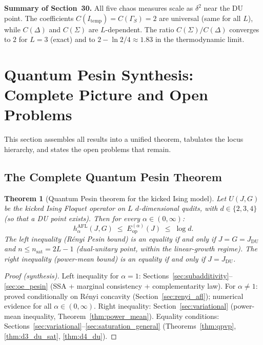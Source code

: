 \documentclass[12pt,a4paper]{article}
\newtheorem{theorem}{Theorem}[section]
\begin{document}
\bigskip
\noindent\textbf{Summary of Section~30.}
All five chaos measures scale as $\delta^2$ near the DU point.
The coefficients $C(I_{\mathrm{temp}})=C(\Gamma_S)=2$ are universal (same for all $L$),
while $C(\Delta)$ and $C(\Sigma)$ are $L$-dependent.
The ratio $C(\Sigma)/C(\Delta)$ converges to $2$ for $L=3$ (exact) and to $2-\ln 2/4\approx1.83$
in the thermodynamic limit.

\section{Quantum Pesin Synthesis: Complete Picture and Open Problems}
\label{sec:synthesis}

This section assembles all results into a unified theorem, tabulates the locus hierarchy,
and states the open problems that remain.

\subsection{The Complete Quantum Pesin Theorem}
\label{subsec:complete_pesin}

\begin{theorem}[Quantum Pesin theorem for the kicked Ising model]
\label{thm:complete_pesin}
Let $U(J,G)$ be the kicked Ising Floquet operator on $L$ $d$-dimensional qudits,
with $d\in\{2,3,4\}$ (so that a DU point exists). Then for every $\alpha\in(0,\infty)$:
\begin{equation}
  \boxed{h_\alpha^{\mathrm{AFL}}(J,G) \;\leq\; E_{\mathrm{op}}^{(\alpha)}(J) \;\leq\; \log d.}
\end{equation}
The left inequality (\emph{Rényi Pesin bound}) is an equality if and only if $J=G=J_{\mathrm{DU}}$
and $n\leq n_{\mathrm{sat}}=2L-1$ (dual-unitary point, within the linear-growth regime).
The right inequality (power-mean bound) is an equality if and only if $J=J_{\mathrm{DU}}$.
\end{theorem}

\begin{proof}[Proof (synthesis)]
Left inequality for $\alpha=1$: Sections~\ref{sec:subadditivity}--\ref{sec:oe_pesin} (SSA + marginal consistency + complementarity law). For $\alpha\neq 1$: proved conditionally on Rényi concavity (Section~\ref{sec:renyi_afl}); numerical evidence for all $\alpha\in(0,\infty)$.
Right inequality: Section~\ref{sec:variational} (power-mean inequality, Theorem~\ref{thm:power_mean}).
Equality conditions: Sections~\ref{sec:variational}--\ref{sec:saturation_general}
(Theorems~\ref{thm:qpvp}, \ref{thm:d3_du_sat}, \ref{thm:d4_du}).
\end{proof}
\end{document}
